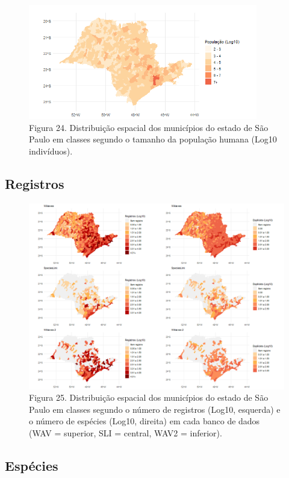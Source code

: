 \begin{figure}[h!]
\centering
\includegraphics[height = 5cm]{Imagens/531.png}
\\{\scriptsize Figura 24. Distribuição espacial dos municípios do estado de São Paulo em classes segundo o tamanho da população humana (Log10 indivíduos).}
\end{figure}

\texto

\newpage

\subsection {Registros}

\begin{figure}[h!]
\centering
\includegraphics[width=17cm]{Imagens/561.png}
\\{\scriptsize Figura 25. Distribuição espacial dos municípios do estado de São Paulo em classes segundo o número de registros (Log10, esquerda) e o número de espécies (Log10, direita) em cada banco de dados (WAV = superior, SLI = central, WAV2 = inferior).}
\end{figure}

\texto

\subsection {Espécies}

\texto


